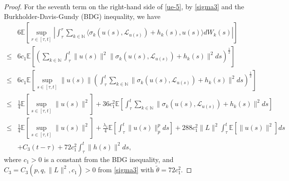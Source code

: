 \documentclass[11pt]{article}
\numberwithin{equation}{section}
\theoremstyle{plain}
\begin{document}
\begin{proof}
 For the seventh term on the right-hand side of \eqref{ue-5},
 by \eqref{sigma3}  and the Burkholder-Davis-Gundy (BDG) inequality, we have
 \begin{align}\label{ue-7}
       & 6 \mathbb{E}
                \left[ \sup_{r \in [\tau, t]}
                       \left| \int_{\tau}^{r} \sum_{k \in \mathbb{N} }
                                 \langle \sigma_k(u(s), \mathcal{L}_{u(s)}) + h_k(s),
                                         u(s)
                                 \rangle dW_k(s)
                       \right|
                \right]  \nonumber \\
 \le & 6 c_1 \mathbb{E}
                   \left[
                         \left( \sum_{k \in \mathbb{N} }
                                   \int_{\tau}^{t} \| u(s)\|^2
                                         \|\sigma_k(u(s), \mathcal{L}_{u(s)}) + h_k(s)\|^2 ds
                         \right)^{\frac{1}{2}}
                   \right] \nonumber\\
 \le & 6 c_1
          \mathbb{E}
             \left[ \sup_{s \in [\tau, t]} \| u(s)\|
                       \left( \int_{\tau}^{t}
                                 \sum_{k \in \mathbb{N} }
                                     \|\sigma_k(u(s), \mathcal{L}_{u(s)}) + h_k(s)\|^2
                               ds
                       \right)^{\frac{1}{2}}
             \right]  \nonumber\\
 \le & \frac{1}{4} \mathbb{E} \left[ \sup_{s \in [\tau, t]} \| u(s)\|^2 \right]
          + 36 c_1^2
            \mathbb{E}
               \left[ \int_{\tau}^{t}
                         \sum_{k \in \mathbb{N} } \|\sigma_k(u(s), \mathcal{L}_{u(s)}) + h_k(s)\|^2
                       ds
               \right]  \nonumber \\
 \le & \frac{1}{4} \mathbb{E} \left[ \sup_{s \in [\tau, t]} \| u(s)\|^2 \right]
          + \frac{\lambda_1}{4}
               \mathbb{E}
                  \left[ \int_{\tau}^{t} \|u(s)\|^p_p ds
                  \right]
          + 288 c_1^2 \|L\|^2
            \int_{\tau}^{t}
               \mathbb{E} \left[ \|u(s)\|^2 \right] ds  \nonumber \\
      & + C_3  (t-\tau)
          + 72 c_1^2
               \int_{\tau}^{t} \|h(s)\|^2 ds,
 \end{align}
 where $c_1>0$ is a constant
 from the BDG inequality, and
 $C_3=C_3(p,q, \|L\|^2, c_1)>0$ from
  \eqref{sigma3} with $\tilde{\theta}=72 c_1^2$. 


\end{proof}
\end{document}

